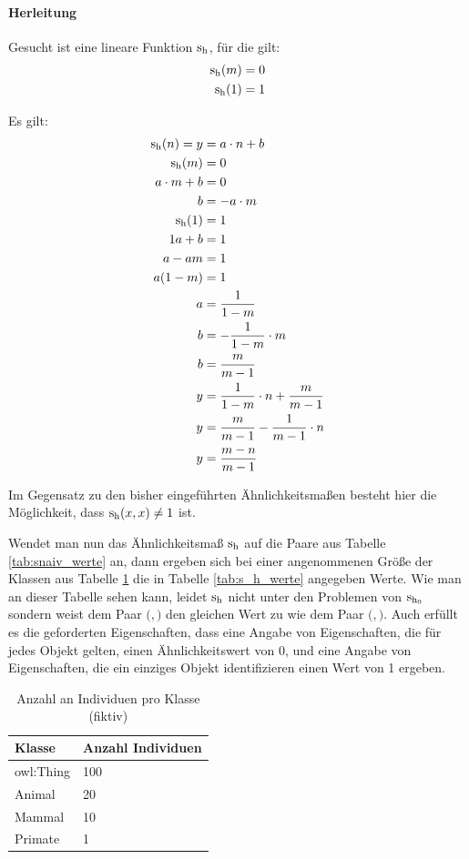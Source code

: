 \paragraph{Herleitung}
Gesucht ist eine lineare Funktion $\textnormal{s}_{\textnormal{h}}$, für die gilt:
\begin{eqnarray}
\textnormal{s}_{\textnormal{h}}(m)	&= 0\\
\textnormal{s}_{\textnormal{h}}(1)	&= 1
\end{eqnarray}

Es gilt:
\begin{align*}
\textnormal{s}_{\textnormal{h}}(n)	= y	&= a\cdot n + b\\
\textnormal{s}_{\textnormal{h}}(m)		&= 0\\
a\cdot m+b	&= 0\\
b		&= -a\cdot m\\
\textnormal{s}_{\textnormal{h}}(1)		&= 1\\
1a+b		&= 1\\
a-am		&= 1\\
a(1-m)		&= 1\\
a		&= \frac{1}{1-m}\\
b		&= -\frac{1}{1-m}\cdot m\\
b		&= \frac{m}{m-1}\\
y		&= \frac{1}{1-m} \cdot n + \frac{m}{m-1}\\
y		&= \frac{m}{m-1}  - \frac{1}{m-1} \cdot n\\
y		&= \frac{m-n}{m-1}\\
\end{align*}

\begin{bem}
Im Gegensatz zu den bisher eingeführten Ähnlichkeitsmaßen besteht hier die Möglichkeit, dass $\textnormal{s}_{\textnormal{h}}(x,x) \neq 1$ ist.
\end{bem}

Wendet man nun das Ähnlichkeitsmaß $\textnormal{s}_{\textnormal{h}}$ auf die Paare aus Tabelle \ref{tab:snaiv_werte} an, dann ergeben sich bei einer angenommenen Größe der Klassen aus Tabelle \ref{tab:klassengroessen_fiktiv} die
in Tabelle \ref{tab:s_h_werte} angegeben Werte. Wie man an dieser Tabelle sehen kann, leidet $\textnormal{s}_{\textnormal{h}}$ nicht unter den Problemen von $\textnormal{s}_{\textnormal{h}_0}$ sondern weist dem Paar $($$,$$)$ den
gleichen Wert zu wie dem Paar $($$,$$)$. Auch erfüllt es die geforderten Eigenschaften, dass eine Angabe von Eigenschaften, die für jedes Objekt gelten, einen Ähnlichkeitswert von 0,
und eine Angabe von Eigenschaften, die ein einziges Objekt identifizieren einen Wert von 1 ergeben.

\begin{table}[H]
\begin{tabular}{ll}
\toprule
Klasse		&Anzahl Individuen\\
\midrule
owl:Thing	&100\\
Animal		&20\\
Mammal		&10\\
Primate		&1\\
\bottomrule
\end{tabular}
\caption{Anzahl an Individuen pro Klasse (fiktiv)}
\label{tab:klassengroessen_fiktiv}
\end{table}

